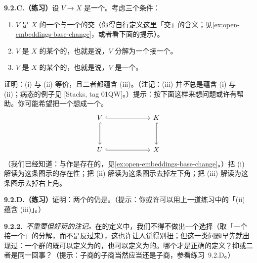 \textbf{9.2.C.（练习）}\quad 设 $V\to X$ 是一个\trMorphism。考虑三个条件：
\begin{enumerate}[label=(\roman*)]
\item $V$ 是 $X$ 的一个\trOpenSubscheme{}与一个\trClosedSubscheme{}的交（你得自行定义这里「交」的含义；见\cref{ex:open-embeddings-base-change}，或者看下面的提示）。
\item $V$ 是 $X$ 的某个\trClosedSubscheme{}的\trOpenSubscheme，也就是说，$V$ 分解为一个\trOpenEmbedding{}接一个\trClosedEmbedding。
\item $V$ 是 $X$ 的某个\trOpenSubscheme{}的\trClosedSubscheme，也就是说，$V$ 是一个\trLocally\trClosedEmbedding。
\end{enumerate}
证明：(i) 与 (ii) 等价，且二者都蕴含 (iii)。（注记：(iii) 并\emph{不}总是蕴含 (i) 与 (ii)；病态的例子见 [Stacks, tag 01QW]。）提示：按下面这样来想问题或许有帮助。你可能希望把一个\trLocally\trClosedEmbedding{}想成一个\trCartesianDiagram。
\[
\begin{tikzcd}[row sep=3.2em, column sep=6.5em]
V \ar[r, hook, "\text{\trOpenEmbedding}"] \ar[d, hook, "\text{\trClosedEmbedding}"] & K \ar[d, hook, "\text{\trClosedEmbedding}"'] \\
U \ar[r, hook, "\text{\trOpenEmbedding}"'] & X
\end{tikzcd}
\]
（我们已经知道：与\trOpenEmbedding{}作\trFiberProduct{}是存在的，见\cref{ex:open-embeddings-base-change}。）把 (i) 解读为这条图示的存在性；把 (ii) 解读为这条图示去掉左下角；把 (iii) 解读为这条图示去掉右上角。

\textbf{9.2.D.（练习）}\quad 证明：两个\trLocally\trClosedEmbedding{}的\trComposition{}仍是\trLocally\trClosedEmbedding。（提示：你或许可以用上一道练习中的「(ii) 蕴含 (iii)」。）

\textbf{9.2.2.}\ \emph{不重要但好玩的注记。}\quad 在\trLocally\trClosedEmbedding{}的定义中，我们不得不做出一个选择（取「一个\trClosedEmbedding{}接一个\trOpenEmbedding」的分解，而不是反过来），这也许让人觉得别扭；但这一类问题早先就出现过：一个群的\trSubquotient{}既可以定义为\trSubgroup{}的\trQuotient，也可以定义为\trQuotient{}的\trSubgroup。哪个才是正确的定义？抑或二者是同一回事？（提示：子商的子商当然应当还是子商，参看练习~9.2.D。）
